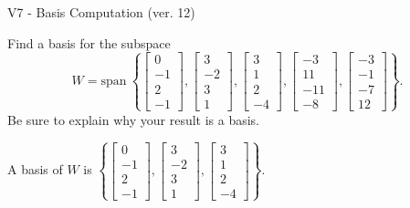 \begin{exercise}
  \begin{exerciseTitle}V7 - Basis Computation (ver. 12)\end{exerciseTitle}
  \begin{exerciseStatement}
    Find a basis for the subspace 
\[W=\mathrm{span}\ \left\{\left[\begin{array}{r}
0 \\
-1 \\
2 \\
-1
\end{array}\right] , \left[\begin{array}{r}
3 \\
-2 \\
3 \\
1
\end{array}\right] , \left[\begin{array}{r}
3 \\
1 \\
2 \\
-4
\end{array}\right] , \left[\begin{array}{r}
-3 \\
11 \\
-11 \\
-8
\end{array}\right] , \left[\begin{array}{r}
-3 \\
-1 \\
-7 \\
12
\end{array}\right]\right\}.\]
 Be sure to explain why your result is a basis.


  \end{exerciseStatement}
  \begin{exerciseAnswer}
   A basis of \(W\) is  \(\left\{\left[\begin{array}{r}
0 \\
-1 \\
2 \\
-1
\end{array}\right] , \left[\begin{array}{r}
3 \\
-2 \\
3 \\
1
\end{array}\right] , \left[\begin{array}{r}
3 \\
1 \\
2 \\
-4
\end{array}\right]\right\}\).
  


  \end{exerciseAnswer}
\end{exercise}